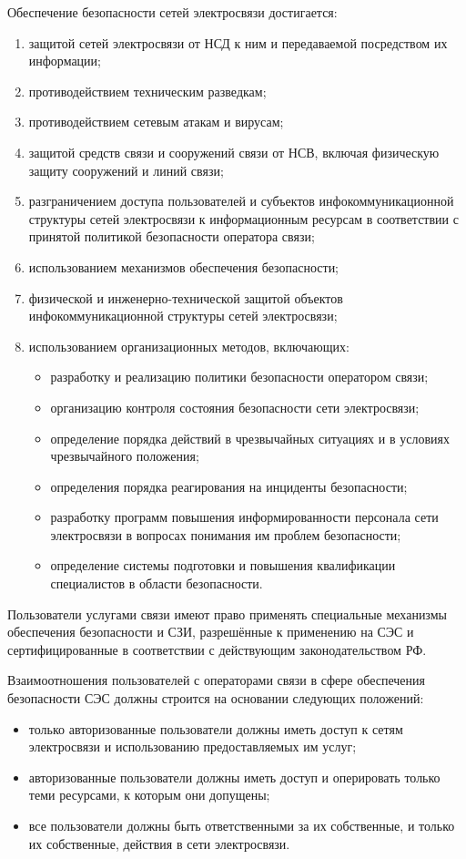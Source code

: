 \documentclass[12pt, russian, oneside, article]{ncc}
\begin{document}
Обеспечение безопасности сетей электросвязи достигается:
\begin{enumerate}
\item защитой сетей электросвязи от НСД к ним и передаваемой посредством их информации;
\item противодействием техническим разведкам;
\item противодействием сетевым атакам и вирусам;
\item защитой средств связи и сооружений связи от НСВ, включая физическую защиту сооружений и линий связи;
\item разграничением доступа пользователей и субъектов инфокоммуникационной структуры сетей электросвязи к информационным ресурсам в соответствии с принятой политикой безопасности оператора связи;
\item использованием механизмов обеспечения безопасности;
\item физической и инженерно-технической защитой объектов инфокоммуникационной структуры сетей электросвязи;
\item использованием организационных методов, включающих:

\begin{itemize}
\item разработку и реализацию политики безопасности оператором связи;
\item организацию контроля состояния безопасности сети электросвязи;
\item определение порядка действий в чрезвычайных ситуациях и в условиях чрезвычайного положения;
\item определения порядка реагирования на инциденты безопасности;
\item разработку программ повышения информированности персонала сети электросвязи в вопросах понимания им проблем безопасности;
\item определение системы подготовки и повышения квалификации специалистов в области безопасности.
\end{itemize}

\end{enumerate}

Пользователи услугами связи имеют право применять специальные механизмы обеспечения безопасности и СЗИ, разрешённые к применению на СЭС и сертифицированные в соответствии с действующим законодательством РФ. 

Взаимоотношения пользователей с операторами связи в сфере обеспечения безопасности СЭС должны строится на основании следующих положений:
\begin{itemize}
\item только авторизованные пользователи должны иметь доступ к сетям электросвязи и использованию предоставляемых им услуг;
\item авторизованные пользователи должны иметь доступ и оперировать только теми ресурсами, к которым они допущены;
\item все пользователи должны быть ответственными за их собственные, и только их собственные, действия в сети электросвязи.
\end{itemize}
\end{document}
